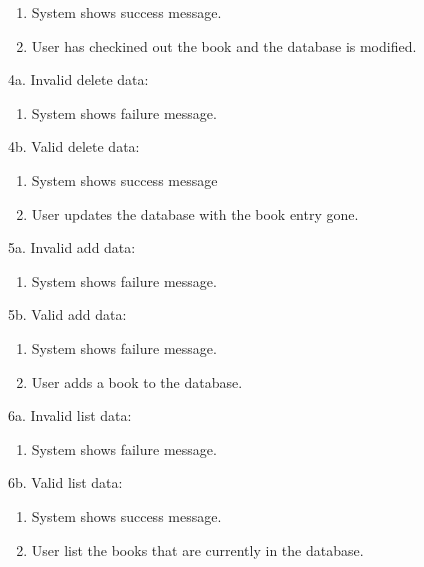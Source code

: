 \documentclass[a4paper, 10pt, oneside, draft]{article}
\begin{document}
\begin{usecase}
{\begin{enumerate}[1.]
		\item System shows success message.
		\item User has checkined out the book and the database is modified.
		\end{enumerate}
	\item[4a.] Invalid delete data:
        \begin{enumerate}[1.]
		\item System shows failure message.
		\end{enumerate}
	\item[4b.] Valid delete data:
        \begin{enumerate}[1.]
		\item System shows success message
		\item User updates the database with the book entry gone.
		\end{enumerate}
	\item[5a.] Invalid add data:
        \begin{enumerate}[1.]
		\item System shows failure message.
		\end{enumerate}
	\item[5b.] Valid add data:
        \begin{enumerate}[1.]
		\item System shows failure message.
		\item User adds a book to the database.
		\end{enumerate}
	\item[6a.] Invalid list data:
        \begin{enumerate}[1.]
		\item System shows failure message.
		\end{enumerate}
	\item[6b.] Valid list data:
        \begin{enumerate}[1.]
		\item System shows success message.
		\item User list the books that are currently in the database.
		\end{enumerate}
}





\end{usecase}
\end{document}
